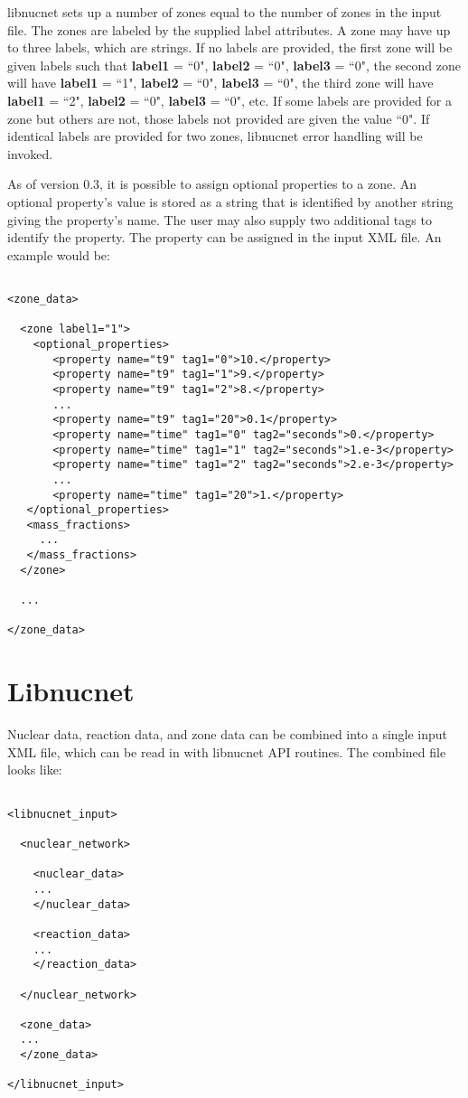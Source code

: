\documentclass{article}    %
\begin{document}
libnucnet sets up a number of zones equal to the number of zones in
the input file.  The zones are labeled by the supplied label attributes.
A zone may have up to three labels, which are strings.
If no labels are provided, the first zone will be given labels such
that {\bf label1} = ``0", {\bf label2} = ``0", {\bf label3} = ``0",
the second zone will have
{\bf label1} = ``1", {\bf label2} = ``0", {\bf label3} = ``0",
the third zone will have
{\bf label1} = ``2", {\bf label2} = ``0", {\bf label3} = ``0", etc.
If some labels are provided for a zone but others are not, those labels
not provided are given the value ``0".  If identical labels are provided
for two zones, libnucnet error handling will be invoked.

As of version 0.3, it is possible to assign optional properties to a zone.
An optional property's value is stored as a string that is identified by
another string giving the property's name.  The user may also supply two
additional tags to identify the property.  The property can be assigned in the
input XML file.  An example would be:

\begin{verbatim}

<zone_data>

  <zone label1="1">
    <optional_properties>
       <property name="t9" tag1="0">10.</property>
       <property name="t9" tag1="1">9.</property>
       <property name="t9" tag1="2">8.</property>
       ...
       <property name="t9" tag1="20">0.1</property>
       <property name="time" tag1="0" tag2="seconds">0.</property>
       <property name="time" tag1="1" tag2="seconds">1.e-3</property>
       <property name="time" tag1="2" tag2="seconds">2.e-3</property>
       ...
       <property name="time" tag1="20">1.</property> 
   </optional_properties>
   <mass_fractions>
     ...
   </mass_fractions>
  </zone>

  ...

</zone_data>

\end{verbatim}

\section{Libnucnet}

Nuclear data, reaction data, and zone data can be combined into a single input
XML file, which can be read in with libnucnet API routines.  The combined
file looks like:

\begin{verbatim}

<libnucnet_input>

  <nuclear_network>

    <nuclear_data>
    ...
    </nuclear_data>

    <reaction_data>
    ...
    </reaction_data>

  </nuclear_network>

  <zone_data>
  ...
  </zone_data>

</libnucnet_input>

\end{verbatim}
\end{document}
